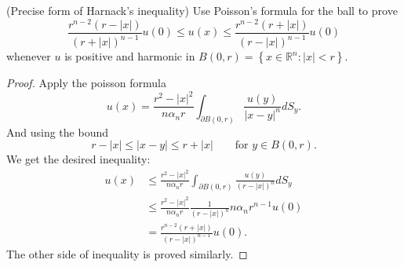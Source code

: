 \begin{problem}
	(Precise form of Harnack's inequality) Use Poisson's formula for the ball to prove
\[
\frac{r^{n-2}(r-|x|)}{(r+|x|)^{n-1}} u(0) \leq u(x) \leq \frac{r^{n-2}(r+|x|)}{(r-|x|)^{n-1}} u(0)
\]
whenever $u$ is positive and harmonic in $B(0, r)=\left\{x \in \mathbb{R}^n:|x|<r\right\}$.
\end{problem}
\begin{proof}
	Apply the poisson formula
	\[
		u(x) = \frac{r^2 - |x|^2}{n \alpha_n r}
		\int _{\partial B(0,r)} \frac{u(y)}{|x - y|^n} d S_y
	.\] 
	And using the bound
	\[
		r - |x| \le |x - y| \le r + |x| \qquad \text{for } y \in B(0,r) 
	.\] 
	We get the desired inequality:
	\begin{align*}
		u(x) &\le 
		\frac{r^2 - |x|^2}{n \alpha_n r}
		\int _{\partial B(0,r)} \frac{u(y)}{(r - |x|)^n} d S_y\\
		&\leq 
		\frac{r^2 - |x|^2}{n \alpha_n r}
		\frac{1}{(r - |x|)^n}
		n \alpha_n r^{n-1} u(0)\\
		&= \frac{r^{n-2} (r + |x|)}{(r - |x|)^{n-1}}u\left( 0 \right) 
	.\end{align*}
	The other side of inequality is proved similarly.
\end{proof}

